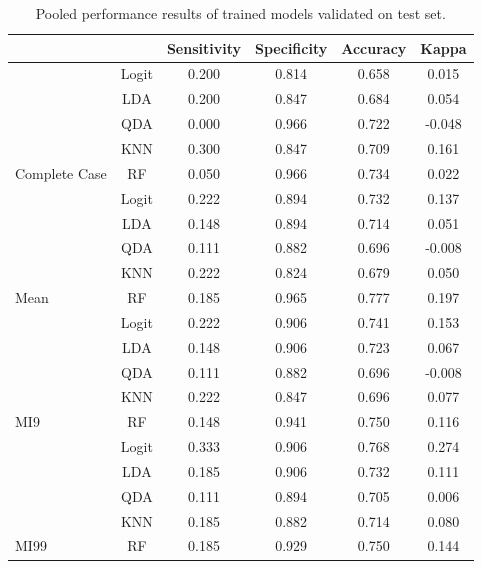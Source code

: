 \documentclass[12pt,]{article}
\begin{document}
\begin{table}[!h]

\caption{\label{tab:unnamed-chunk-9}\label{tab:metrics} Pooled performance results of trained models validated on test set.}
\centering
\fontsize{10}{12}\selectfont
\begin{tabular}{lccccc}
\toprule
 &  & Sensitivity & Specificity & Accuracy & Kappa\\
\midrule
 & Logit & 0.200 & 0.814 & 0.658 & 0.015\\

 & LDA & 0.200 & 0.847 & 0.684 & 0.054\\

 & QDA & 0.000 & 0.966 & 0.722 & -0.048\\

 & KNN & 0.300 & 0.847 & 0.709 & 0.161\\

\multirow{-5}{*}{\raggedright\arraybackslash Complete Case} & RF & 0.050 & 0.966 & 0.734 & 0.022\\
\cmidrule{1-6}
 & Logit & 0.222 & 0.894 & 0.732 & 0.137\\

 & LDA & 0.148 & 0.894 & 0.714 & 0.051\\

 & QDA & 0.111 & 0.882 & 0.696 & -0.008\\

 & KNN & 0.222 & 0.824 & 0.679 & 0.050\\

\multirow{-5}{*}{\raggedright\arraybackslash Mean} & RF & 0.185 & 0.965 & 0.777 & 0.197\\
\cmidrule{1-6}
 & Logit & 0.222 & 0.906 & 0.741 & 0.153\\

 & LDA & 0.148 & 0.906 & 0.723 & 0.067\\

 & QDA & 0.111 & 0.882 & 0.696 & -0.008\\

 & KNN & 0.222 & 0.847 & 0.696 & 0.077\\

\multirow{-5}{*}{\raggedright\arraybackslash MI9} & RF & 0.148 & 0.941 & 0.750 & 0.116\\
\cmidrule{1-6}
 & Logit & 0.333 & 0.906 & 0.768 & 0.274\\

 & LDA & 0.185 & 0.906 & 0.732 & 0.111\\

 & QDA & 0.111 & 0.894 & 0.705 & 0.006\\

 & KNN & 0.185 & 0.882 & 0.714 & 0.080\\

\multirow{-5}{*}{\raggedright\arraybackslash MI99} & RF & 0.185 & 0.929 & 0.750 & 0.144\\
\bottomrule
\end{tabular}
\end{table}
\end{document}
